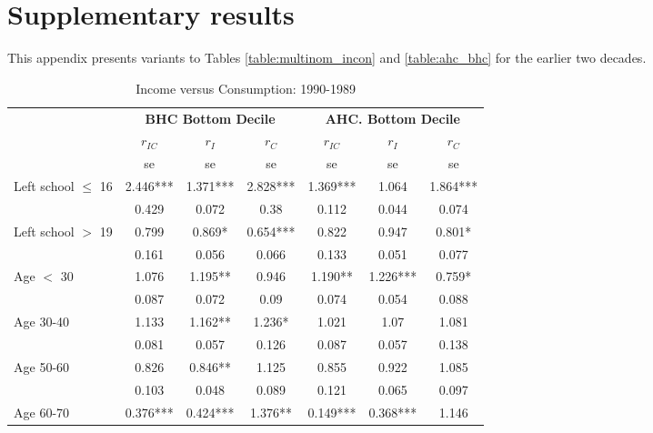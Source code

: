 \section{Supplementary results} \label{sec:annex_results}

This appendix presents variants to Tables \ref{table:multinom_incon} and \ref{table:ahc_bhc} for the earlier two decades.


\begin{table}
\caption{Income versus Consumption: 1990-1989}
\centering
\begin{tabular}{l|ccc|ccc}
\hline\hline 
	& \multicolumn{3}{c}{\textbf{BHC Bottom Decile}} &  \multicolumn{3}{c}{\textbf{AHC. Bottom Decile}} \\
	&	$r_{IC}$	&	$r_{I}$	&	$r_{C}$	&	$r_{IC}$	&	$r_{I}$	&	$r_{C}$	\\
  & se & se & se  & se & se & se \\
\hline
Left school $\leq$ 16	&	       2.446***	&	       1.371***	&	       2.828***	&	       1.369***	&	1.064	&	       1.864***	\\				
                    	&	       0.429   	&	0.072	&	0.38	&	       0.112   	&	0.044	&	0.074	\\				
Left school $>$ 19	&	       0.799   	&	       0.869*  	&	       0.654***	&	       0.822   	&	0.947	&	       0.801*  	\\				
                    	&	       0.161   	&	0.056	&	0.066	&	       0.133   	&	0.051	&	0.077	\\				
Age $<$ 30	&	       1.076   	&	       1.195** 	&	0.946	&	       1.190** 	&	       1.226***	&	       0.759*  	\\				
                    	&	       0.087   	&	0.072	&	0.09	&	       0.074   	&	0.054	&	0.088	\\				
Age 30-40	&	       1.133   	&	       1.162** 	&	       1.236*  	&	       1.021   	&	1.07	&	1.081	\\				
                    	&	       0.081   	&	0.057	&	0.126	&	       0.087   	&	0.057	&	0.138	\\				
Age 50-60	&	       0.826   	&	       0.846** 	&	1.125	&	       0.855   	&	0.922	&	1.085	\\				
                    	&	       0.103   	&	0.048	&	0.089	&	       0.121   	&	0.065	&	0.097	\\				
Age 60-70	&	       0.376***	&	       0.424***	&	       1.376** 	&	       0.149***	&	       0.368***	&	1.146	\\				

\end{tabular}
\end{table}

